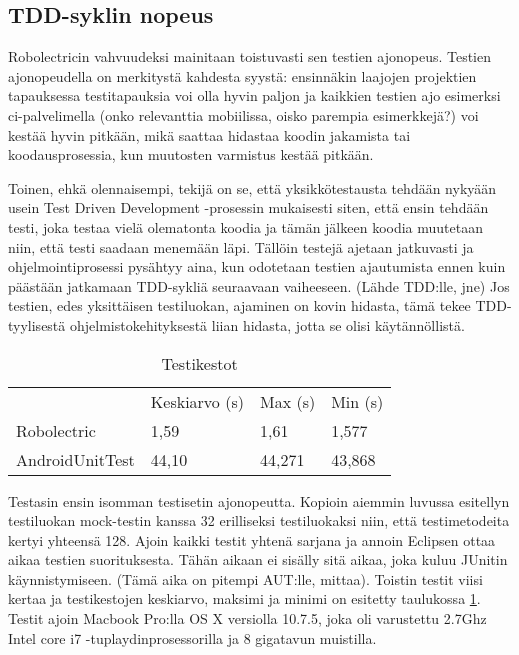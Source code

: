 \subsection{TDD-syklin nopeus}

Robolectricin vahvuudeksi mainitaan toistuvasti sen testien ajonopeus. Testien ajonopeudella on merkitystä kahdesta syystä: ensinnäkin laajojen projektien tapauksessa testitapauksia voi olla hyvin paljon ja kaikkien testien ajo esimerksi ci-palvelimella (onko relevanttia mobiilissa, oisko parempia esimerkkejä?) voi kestää hyvin pitkään, mikä saattaa hidastaa koodin jakamista tai koodausprosessia, kun muutosten varmistus kestää pitkään.

Toinen, ehkä olennaisempi, tekijä on se, että yksikkötestausta tehdään nykyään usein Test Driven Development -prosessin mukaisesti siten, että ensin tehdään testi, joka testaa vielä olematonta koodia ja tämän jälkeen koodia muutetaan niin, että testi saadaan menemään läpi. Tällöin testejä ajetaan jatkuvasti ja ohjelmointiprosessi pysähtyy aina, kun odotetaan testien ajautumista ennen kuin päästään jatkamaan TDD-sykliä seuraavaan vaiheeseen. (Lähde TDD:lle, jne) Jos testien, edes yksittäisen testiluokan, ajaminen on kovin hidasta, tämä tekee TDD-tyylisestä ohjelmistokehityksestä liian hidasta, jotta se olisi käytännöllistä.

\begin{table}[h]
\centering
\begin{tabular}{ l l l l }
   & Keskiarvo (s) & Max (s) & Min (s) \\
  Robolectric & 1,59 & 1,61 & 1,577 \\
  AndroidUnitTest & 44,10 & 44,271 & 43,868 \\
\end{tabular}
\caption{Testikestot}
\label{unittest_timing}
\end{table}

Testasin ensin isomman testisetin ajonopeutta. Kopioin aiemmin luvussa esitellyn testiluokan mock-testin kanssa 32 erilliseksi testiluokaksi niin, että testimetodeita kertyi yhteensä 128. Ajoin kaikki testit yhtenä sarjana ja annoin Eclipsen ottaa aikaa testien suorituksesta. Tähän aikaan ei sisälly sitä aikaa, joka kuluu JUnitin käynnistymiseen. (Tämä aika on pitempi AUT:lle, mittaa). Toistin testit viisi kertaa ja testikestojen keskiarvo, maksimi ja minimi on esitetty taulukossa \ref{unittest_timing}. Testit ajoin Macbook Pro:lla OS X versiolla 10.7.5, joka oli varustettu 2.7Ghz Intel core i7 -tuplaydinprosessorilla ja 8 gigatavun muistilla.

